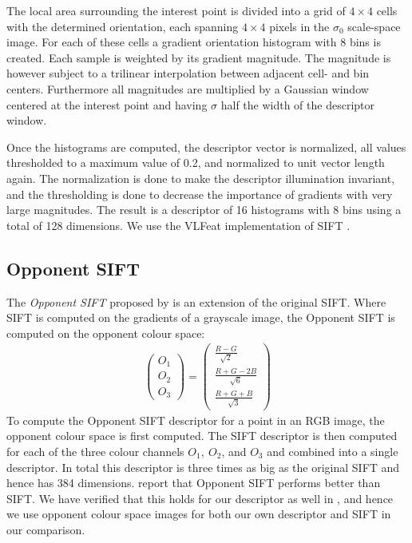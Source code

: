 \documentclass[thesis.tex]{subfiles}
\begin{document}
The local area surrounding the interest point is divided into a grid of $4 \times 4$ cells with the determined orientation, each spanning $4 \times 4$ pixels in the $\sigma_0$ scale-space image. For each of these cells a gradient orientation histogram with 8 bins is created. Each sample is weighted by its gradient magnitude. The magnitude is however subject to a trilinear interpolation between adjacent cell- and bin centers. Furthermore all magnitudes are multiplied by a Gaussian window centered at the interest point and having $\sigma$ half the width of the descriptor window.

Once the histograms are computed, the descriptor vector is normalized, all values thresholded to a maximum value of 0.2, and normalized to unit vector length again. The normalization is done to make the descriptor illumination invariant, and the thresholding is done to decrease the importance of gradients with very large magnitudes.
The result is a descriptor of 16 histograms with 8 bins using a total of 128 dimensions. We use the VLFeat implementation of SIFT \cite{vedaldi2008vlfeat}.

\subsection{Opponent SIFT}
\label{sec:opponentColourSpace}

The \emph{Opponent SIFT} proposed by \citet{van2010evaluating} is an extension of the original SIFT. Where SIFT is computed on the gradients of a grayscale image, the Opponent SIFT is computed on the opponent colour space:
\begin{align*}
	\begin{pmatrix} O_1 \\ O_2 \\ O_3 \end{pmatrix} =
		\begin{pmatrix}
			\frac{R-G}{\sqrt{2}} \\
			\frac{R+G-2B}{\sqrt{6}} \\
			\frac{R+G+B}{\sqrt{3}}
		\end{pmatrix}
\end{align*}
To compute the Opponent SIFT descriptor for a point in an RGB image, the opponent colour space is first computed. The SIFT descriptor is then computed for each of the three colour channels $O_1,~O_2$, and $O_3$ and combined into a single descriptor. In total this descriptor is three times as big as the original SIFT and hence has 384 dimensions. \citet{van2010evaluating} report that Opponent SIFT performs better than SIFT. We have verified that this holds for our descriptor as well in , and hence we use opponent colour space images for both our own descriptor and SIFT in our comparison.
\end{document}
